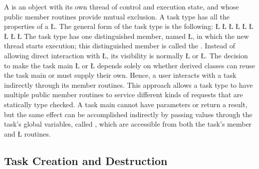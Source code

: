\documentclass[openright,twoside]{report}
\begin{document}
A  is an object with its own thread of control and execution state, and whose public member routines provide mutual exclusion.
A task type has all the properties of a \LGinlinetrue\LGbegin\lgrinde\L{}\endlgrinde\LGend{}.
The general form of the task type is the following:
\LGinlinefalse\LGbegin\lgrinde
\L{}
\L{}
\L{\LB{}}
\CE{}\L{}
\L{\LB{}}
\CE{}\L{\LB{}}
\CE{}\L{}
\L{\LB{}}
\CE{}\L{\LB{\};}}
\endlgrinde\LGend
{}%
The task type has one distinguished member, named \LGinlinetrue\LGbegin\lgrinde\L{}\endlgrinde\LGend{}, in which the new thread starts execution;
this distinguished member is called the .
Instead of allowing direct interaction with \LGinlinetrue\LGbegin\lgrinde\L{}\endlgrinde\LGend{}, its visibility is normally \LGinlinetrue\LGbegin\lgrinde\L{}\endlgrinde\LGend{} or \LGinlinetrue\LGbegin\lgrinde\L{}\endlgrinde\LGend{}.
The decision to make the task main \LGinlinetrue\LGbegin\lgrinde\L{}\endlgrinde\LGend{} or \LGinlinetrue\LGbegin\lgrinde\L{}\endlgrinde\LGend{} depends solely on whether derived classes can reuse the task main or must supply their own.
Hence, a user interacts with a task indirectly through its member routines.
This approach allows a task type to have multiple public member routines to service different kinds of requests that are statically type checked.
A task main cannot have parameters or return a result, but the same effect can be accomplished indirectly by passing values through the task's global variables, called , which are accessible from both the task's member and \LGinlinetrue\LGbegin\lgrinde\L{}\endlgrinde\LGend{} routines.


\subsection{Task Creation and Destruction}
\end{document}

